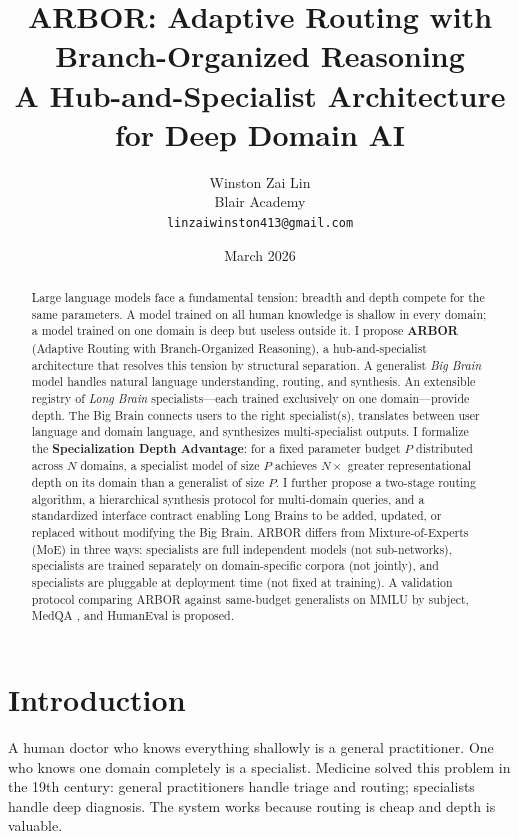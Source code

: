 \documentclass[12pt]{article}
\title{\textbf{ARBOR: Adaptive Routing with Branch-Organized Reasoning\\
A Hub-and-Specialist Architecture for Deep Domain AI}}
\author{
    Winston Zai Lin \\
    \small Blair Academy \\
    \small \texttt{linzaiwinston413@gmail.com}
}
\date{March 2026}
\begin{document}
\maketitle

\begin{abstract}
Large language models face a fundamental tension: breadth and depth compete for the same parameters. A model trained on all human knowledge is shallow in every domain; a model trained on one domain is deep but useless outside it. I propose \textbf{ARBOR} (Adaptive Routing with Branch-Organized Reasoning), a hub-and-specialist architecture that resolves this tension by structural separation. A generalist \textit{Big Brain} model handles natural language understanding, routing, and synthesis. An extensible registry of \textit{Long Brain} specialists---each trained exclusively on one domain---provide depth. The Big Brain connects users to the right specialist(s), translates between user language and domain language, and synthesizes multi-specialist outputs. I formalize the \textbf{Specialization Depth Advantage}: for a fixed parameter budget $P$ distributed across $N$ domains, a specialist model of size $P$ achieves $N\times$ greater representational depth on its domain than a generalist of size $P$. I further propose a two-stage routing algorithm, a hierarchical synthesis protocol for multi-domain queries, and a standardized interface contract enabling Long Brains to be added, updated, or replaced without modifying the Big Brain. ARBOR differs from Mixture-of-Experts (MoE) \cite{shazeer2017} in three ways: specialists are full independent models (not sub-networks), specialists are trained separately on domain-specific corpora (not jointly), and specialists are pluggable at deployment time (not fixed at training). A validation protocol comparing ARBOR against same-budget generalists on MMLU \cite{hendrycks2021} by subject, MedQA \cite{jin2021}, and HumanEval \cite{chen2021} is proposed.
\end{abstract}

\section{Introduction}

A human doctor who knows everything shallowly is a general practitioner. One who knows one domain completely is a specialist. Medicine solved this problem in the 19th century: general practitioners handle triage and routing; specialists handle deep diagnosis. The system works because routing is cheap and depth is valuable.
\end{document}
